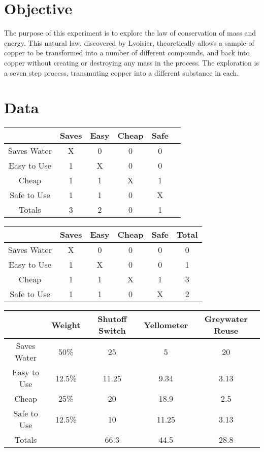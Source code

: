 \documentclass[11pt,letterpaper]{report}
\begin{document}

\pagebreak

\section*{Objective}
The purpose of this experiment is to explore the law of conservation of mass and energy. This natural law, discovered by Lvoisier, theoretically allows a sample of copper to be transformed into a number of different compounds, and back into copper without creating or destroying any mass in the process. The exploration is a seven step process, transmuting copper into a different substance in each.

\section*{Data}
\begin{tabular}{ | c | c | c | c | c | c |}
\hline
 & Saves & Easy & Cheap & Safe \\
\hline
Saves Water & X & 0 & 0 & 0 \\
Easy to Use & 1 & X & 0 & 0 \\ 
Cheap & 1 & 1 & X & 1 \\
Safe to Use & 1 & 1 & 0 & X \\
\hline
Totals & 3 & 2 & 0 & 1 \\
\hline
\end{tabular}

\vspace{1cm}

\begin{tabular}{ | c | c | c | c | c | c |}
\hline
 & Saves & Easy & Cheap & Safe & Total \\
\hline
Saves Water & X & 0 & 0 & 0  & 0 \\
Easy to Use & 1 & X & 0 & 0 & 1\\ 
Cheap & 1 & 1 & X & 1 & 3\\
Safe to Use & 1 & 1 & 0 & X & 2\\
\hline
\end{tabular}

\vspace{1cm}

\begin{tabular}{ | c | c | c | c | c |}
\hline
 & Weight & Shutoff Switch & Yellometer & Greywater Reuse \\
\hline
Saves Water & 50\% & 25 & 5 & 20 \\
Easy to Use & 12.5\% & 11.25 & 9.34 & 3.13 \\ 
Cheap & 25\% & 20 & 18.9 & 2.5 \\
Safe to Use & 12.5\% & 10 & 11.25 & 3.13 \\
\hline
Totals & & 66.3 & 44.5 & 28.8 \\
\hline
\end{tabular}
\end{document}
